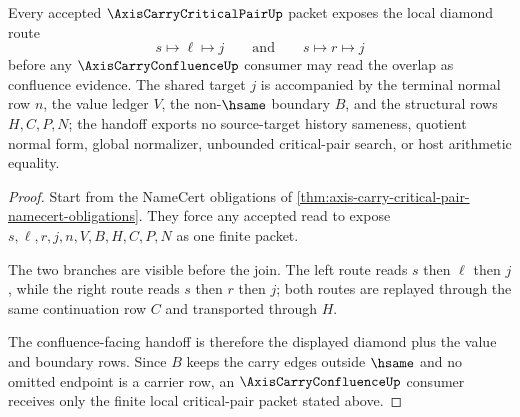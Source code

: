 \begin{theorem}
\label{thm:axis-carry-critical-pair-local-diamond}
Every accepted $\AxisCarryCriticalPairUp$ packet exposes the local diamond route
$$
s \longmapsto \ell \longmapsto j
\qquad
\text{and}
\qquad
s \longmapsto r \longmapsto j
$$
before any $\AxisCarryConfluenceUp$ consumer may read the overlap as confluence evidence. The shared target $j$ is accompanied by the terminal normal row $n$, the value ledger $V$, the non-$\hsame$ boundary $B$, and the structural rows $H,C,P,N$; the handoff exports no source-target history sameness, quotient normal form, global normalizer, unbounded critical-pair search, or host arithmetic equality.
\end{theorem}
\begin{proof}
Start from the NameCert obligations of \autoref{thm:axis-carry-critical-pair-namecert-obligations}. They force any accepted read to expose $s,\ell,r,j,n,V,B,H,C,P,N$ as one finite packet.

The two branches are visible before the join. The left route reads $s$ then $\ell$ then $j$, while the right route reads $s$ then $r$ then $j$; both routes are replayed through the same continuation row $C$ and transported through $H$.

The confluence-facing handoff is therefore the displayed diamond plus the value and boundary rows. Since $B$ keeps the carry edges outside $\hsame$ and no omitted endpoint is a carrier row, an $\AxisCarryConfluenceUp$ consumer receives only the finite local critical-pair packet stated above.
\end{proof}



